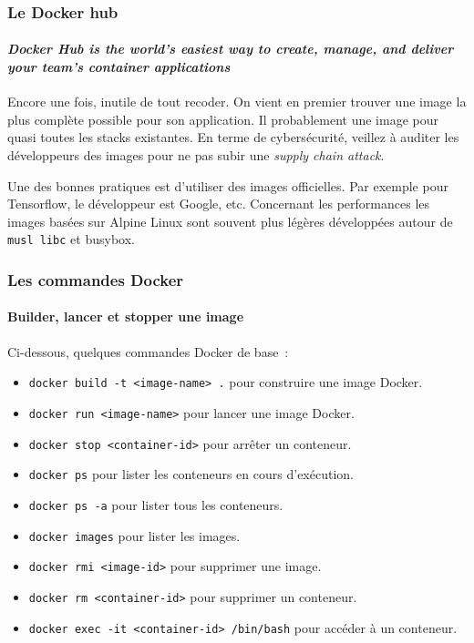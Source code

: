 \documentclass{beamer}
\begin{document}
    \begin{frame}
        \transdissolve
        \frametitle{Le Docker hub}
        \framesubtitle{\textit{Docker Hub is the world's easiest way to create, manage, and deliver your team's container applications}}
        Encore une fois, inutile de tout recoder.
        On vient en premier trouver une image la plus complète possible pour son application.
        \bigbreak
        Il probablement une image pour quasi toutes les stacks existantes.
        \bigbreak
        En terme de cybersécurité, veillez à auditer les développeurs des images pour ne pas subir une \textit{supply chain attack}.

        Une des bonnes pratiques est d'utiliser des images officielles.
        Par exemple pour Tensorflow, le développeur est Google, etc.
        \bigbreak
        Concernant les performances les images basées sur Alpine Linux sont souvent plus légères développées autour de \lstinline{musl libc} et busybox.
    \end{frame}

    \begin{frame}
        \transdissolve
        \frametitle{Les commandes Docker}
        \framesubtitle{Builder, lancer et stopper une image}
        Ci-dessous, quelques commandes Docker de base~:
        \begin{itemize}
            \item \lstinline{docker build -t <image-name> .} pour construire une image Docker.
            \item \lstinline{docker run <image-name>} pour lancer une image Docker.
            \item \lstinline{docker stop <container-id>} pour arrêter un conteneur.
            \item \lstinline{docker ps} pour lister les conteneurs en cours d'exécution.
            \item \lstinline{docker ps -a} pour lister tous les conteneurs.
            \item \lstinline{docker images} pour lister les images.
            \item \lstinline{docker rmi <image-id>} pour supprimer une image.
            \item \lstinline{docker rm <container-id>} pour supprimer un conteneur.
            \item \lstinline{docker exec -it <container-id> /bin/bash} pour accéder à un conteneur.
        \end{itemize}
    \end{frame}
\end{document}
